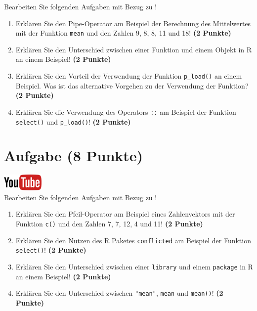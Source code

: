 \documentclass[a4paper, 10pt]{scrartcl}\usepackage[]{graphicx}\usepackage[]{xcolor}
\begin{document}
Bearbeiten Sie folgenden Aufgaben mit Bezug zu \Rlogo! 

\begin{enumerate}
\item Erkl{\"a}ren Sie den Pipe-Operator am Beispiel der Berechnung des Mittelwertes
mit der Funktion \texttt{mean} und den Zahlen 9, 8, 8, 11 und 18!  \textbf{(2 Punkte)} 
\item Erkl{\"a}ren Sie den Unterschied zwischen einer Funktion und einem Objekt
  in R an einem Beispiel! \textbf{(2 Punkte)} 
\item Erkl{\"a}ren Sie den Vorteil der Verwendung der Funktion \texttt{p\_load()} an
einem Beispiel. Was ist das alternative Vorgehen zu der Verwendung der
Funktion? \textbf{(2 Punkte)} 
\item Erkl{\"a}ren Sie die Verwendung des Operators \texttt{::} am Beispiel der
Funktion \texttt{select()} und \texttt{p\_load()}! \textbf{(2 Punkte)} 
\end{enumerate}


 
\clearpage

\section{Aufgabe \hfill (8 Punkte)}

\hfill\href{https://youtu.be/xP9xjcLIbDE}{\includegraphics[width =
  2cm]{img/youtube}}\\[1Ex]




Bearbeiten Sie folgenden Aufgaben mit Bezug zu \Rlogo! 

\begin{enumerate}
  \item Erkl{\"a}ren Sie den Pfeil-Operator am Beispiel eines Zahlenvektors mit der
Funktion \texttt{c()} und den Zahlen 7, 7, 12, 4 und 11! \textbf{(2 Punkte)}
\item Erkl{\"a}ren Sie den Nutzen des R Paketes \texttt{conflicted} am Beispiel der
  Funktion \texttt{select()}! \textbf{(2 Punkte)} 
\item Erkl{\"a}ren Sie den Unterschied zwischen einer \texttt{library} und
  einem \texttt{package} in R an einem Beispiel! \textbf{(2 Punkte)} 
\item Erkl{\"a}ren Sie den Unterschied zwischen \texttt{"mean"}, \texttt{mean}
  und \texttt{mean()}! \textbf{(2 Punkte)} 
\end{enumerate}
\end{document}
